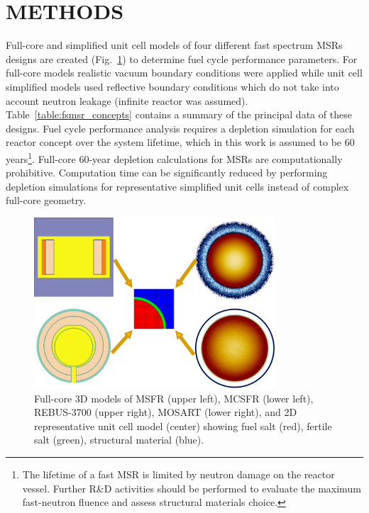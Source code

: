 \documentclass[letterpaper]{mandc2019}
\begin{document}
\section{METHODS}
\label{sec:methods}
Full-core and simplified unit cell models of four different fast spectrum \glspl{MSR} designs are created (Fig.~\ref{fig:unit_cell}) to determine fuel cycle performance parameters. For full-core models realistic vacuum boundary conditions were applied  while unit cell simplified models used reflective boundary conditions which do not take into account neutron leakage (infinite reactor was assumed). Table~\ref{table:fsmsr_concepts} contains a summary of the principal data of these designs. Fuel cycle performance analysis requires a depletion simulation for each reactor concept over the system lifetime, which in this work is assumed to be 60 years\footnote{The lifetime of a fast \gls{MSR} is limited by neutron damage on the reactor vessel. Further R\&D activities should be performed to evaluate the maximum fast-neutron fluence and assess structural materials choice.}. Full-core 60-year depletion calculations for \gls{MSR}s are computationally prohibitive. Computation time can be significantly reduced by performing depletion simulations for representative simplified unit cells instead of complex full-core geometry.
\begin{figure}[!htb]
  \centering
    \vspace{-0.2in}
  \includegraphics[width=0.8\textwidth]{./Figures/fsmsrs.pdf}
  \caption{Full-core 3D models of \gls{MSFR} (upper left), \gls{MCSFR} (lower left), REBUS-3700 (upper right), \gls{MOSART} (lower right), and 2D representative unit cell model (center) showing fuel salt (red), fertile salt (green), structural material (blue).}
  \label{fig:unit_cell}
  \vspace{-0.5in}
\end{figure}
\end{document}
